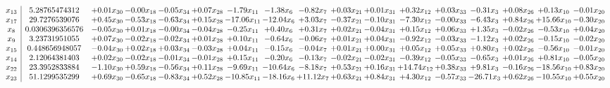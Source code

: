 \documentclass[9pt]{article}
\begin{document}
 \[\begin{array}{c| c c@{\hskip 2pt} c@{\hskip 2pt} c@{\hskip 2pt} c@{\hskip 2pt} c@{\hskip 2pt} c@{\hskip 2pt} c@{\hskip 2pt} c@{\hskip 2pt} c@{\hskip 2pt} c@{\hskip 2pt} c@{\hskip 2pt} c@{\hskip 2pt} c@{\hskip 2pt} c@{\hskip 2pt} c@{\hskip 2pt} }
 x_{13}   &  5.28765474312 & +  0.01 x_{30} & -0.00 x_{18} & -0.05 x_{34} & +  0.07 x_{28} & -1.79 x_{11} & -1.38 x_{6} & -0.82 x_{7} & +  0.03 x_{21} & +  0.01 x_{31} & +  0.32 x_{12} & +  0.03 x_{33} & -0.31 x_{3} & +  0.08 x_{26} & +  0.13 x_{10} & -0.01 x_{20}\\
 x_{17}   &  29.7276539076 & +  0.45 x_{30} & -0.53 x_{18} & -0.63 x_{34} & +  0.15 x_{28} & -17.06 x_{11} & -12.04 x_{6} & +  3.03 x_{7} & -0.37 x_{21} & -0.10 x_{31} & -7.30 x_{12} & -0.00 x_{33} & -6.43 x_{3} & +  0.84 x_{26} & + 15.66 x_{10} & -0.30 x_{20}\\
 x_{8}   &  0.0306396356576 & -0.05 x_{30} & +  0.01 x_{18} & -0.00 x_{34} & -0.04 x_{28} & -0.25 x_{11} & +  0.40 x_{6} & +  0.31 x_{7} & +  0.02 x_{21} & -0.04 x_{31} & +  0.15 x_{12} & +  0.06 x_{33} & +  1.35 x_{3} & -0.02 x_{26} & -0.53 x_{10} & +  0.04 x_{20}\\
 x_{9}   &  3.23731951055 & +  0.07 x_{30} & -0.02 x_{18} & -0.02 x_{34} & +  0.01 x_{28} & +  0.10 x_{11} & -0.64 x_{6} & -0.06 x_{7} & +  0.01 x_{21} & +  0.04 x_{31} & -0.92 x_{12} & -0.03 x_{33} & -1.12 x_{3} & +  0.02 x_{26} & -0.15 x_{10} & -0.02 x_{20}\\
 x_{15}   &  0.448656948057 & -0.04 x_{30} & +  0.02 x_{18} & +  0.03 x_{34} & -0.03 x_{28} & +  0.04 x_{11} & -0.15 x_{6} & -0.04 x_{7} & +  0.01 x_{21} & +  0.00 x_{31} & +  0.05 x_{12} & +  0.05 x_{33} & +  0.80 x_{3} & +  0.02 x_{26} & -0.56 x_{10} & -0.01 x_{20}\\
 x_{14}   &  2.12064381403 & +  0.02 x_{30} & -0.02 x_{18} & -0.01 x_{34} & -0.01 x_{28} & +  0.15 x_{11} & -0.20 x_{6} & -0.13 x_{7} & -0.02 x_{21} & -0.02 x_{31} & -0.39 x_{12} & -0.05 x_{33} & -0.65 x_{3} & +  0.01 x_{26} & +  0.81 x_{10} & -0.05 x_{20}\\
 x_{22}   &  23.3952833884 & -1.10 x_{30} & +  0.59 x_{18} & -0.56 x_{34} & +  0.11 x_{28} & -9.69 x_{11} & -10.64 x_{6} & -8.18 x_{7} & +  0.53 x_{21} & +  0.16 x_{31} & + 14.74 x_{12} & +  0.38 x_{33} & +  9.81 x_{3} & -0.16 x_{26} & -18.56 x_{10} & +  0.83 x_{20}\\
 x_{23}   &  51.1299535299 & +  0.69 x_{30} & -0.65 x_{18} & -0.83 x_{34} & +  0.52 x_{28} & -10.85 x_{11} & -18.16 x_{6} & + 11.12 x_{7} & +  0.63 x_{21} & +  0.84 x_{31} & +  4.30 x_{12} & -0.57 x_{33} & -26.71 x_{3} & +  0.62 x_{26} & -10.55 x_{10} & +  0.55 x_{20}\\

\end{array}\]
\end{document}
